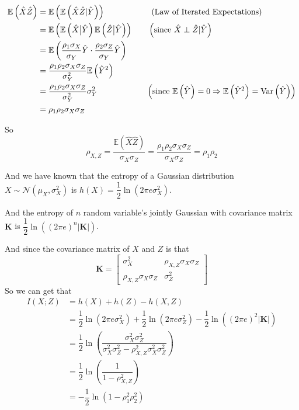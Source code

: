 \begin{align*}
\mathbb{E}\left(\hat{X}\hat{Z}\right) &= \mathbb{E}\left(\mathbb{E}\left(\hat{X}\hat{Z}|\hat{Y}\right)\right) \qquad\qquad\quad\ \ \text{(Law of Iterated Expectations)} \\
&= \mathbb{E}\left(\mathbb{E}\left(\hat{X}\big|\hat{Y}\right)\mathbb{E}\left(\hat{Z}\big|\hat{Y}\right)\right) \qquad \left(\text{since } \hat{X}\perp \hat{Z}|\hat{Y}\right) \\
&= \mathbb{E}\left(\dfrac{\rho_1\sigma_X}{\sigma_Y}\hat{Y}\cdot\dfrac{\rho_2\sigma_Z}{\sigma_Y}\hat{Y}\right) \\
&= \dfrac{\rho_1\rho_2\sigma_X\sigma_Z}{\sigma_Y^2}\mathbb{E}\left(\hat{Y}^2\right) \\
&= \dfrac{\rho_1\rho_2\sigma_X\sigma_Z}{\sigma_Y^2}\sigma_Y^2  \qquad\qquad\qquad \left(\text{since } \mathbb{E}\left(\hat{Y}\right)=0\Rightarrow \mathbb{E}\left(\hat{Y}^2\right)=\mathrm{Var}\left(\hat{Y}\right)\right) \\
&= \rho_1\rho_2\sigma_X\sigma_Z
\end{align*}

So
$$\rho_{X,Z} = \dfrac{\mathbb{E}\left(\hat{X}\hat{Z}\right)}{\sigma_X\sigma_Z}= \dfrac{\rho_1\rho_2\sigma_X\sigma_Z}{\sigma_X\sigma_Z} = \rho_1\rho_2$$

And we have known that the entropy of a Gaussian distribution $X\sim\mathcal{N}(\mu_X,\sigma_X^2)$ is $h(X)=\dfrac{1}{2}\ln\left(2\pi e\sigma_X^2\right)$.

And the entropy of $n$ random variable's jointly Gaussian with covariance matrix $\mathbf{K}$ is $\dfrac{1}{2}\ln\left((2\pi e)^n|\mathbf{K}|\right)$.

And since the covariance matrix of $X$ and $Z$ is that
$$\mathbf{K}=\begin{bmatrix}
\sigma_X^2 & \rho_{X,Z}\sigma_X\sigma_Z \\
\rho_{X,Z}\sigma_X\sigma_Z & \sigma_Z^2
\end{bmatrix}$$
So we can get that
\begin{align*}
I(X;Z) &= h(X)+h(Z)-h(X,Z) \\
&= \dfrac{1}{2}\ln\left(2\pi e\sigma_X^2\right)+\dfrac{1}{2}\ln\left(2\pi e\sigma_Z^2\right)-\dfrac{1}{2}\ln\left((2\pi e)^2|\mathbf{K}|\right) \\
&= \dfrac{1}{2}\ln\left(\dfrac{\sigma_X^2\sigma_Z^2}{\sigma_X^2\sigma_Z^2-\rho_{X,Z}^2\sigma_X^2\sigma_Z^2}\right) \\
&= \dfrac{1}{2}\ln\left(\dfrac{1}{1-\rho_{X,Z}^2}\right) \\
&= -\dfrac{1}{2}\ln\left(1-\rho_1^2\rho_2^2\right)
\end{align*}